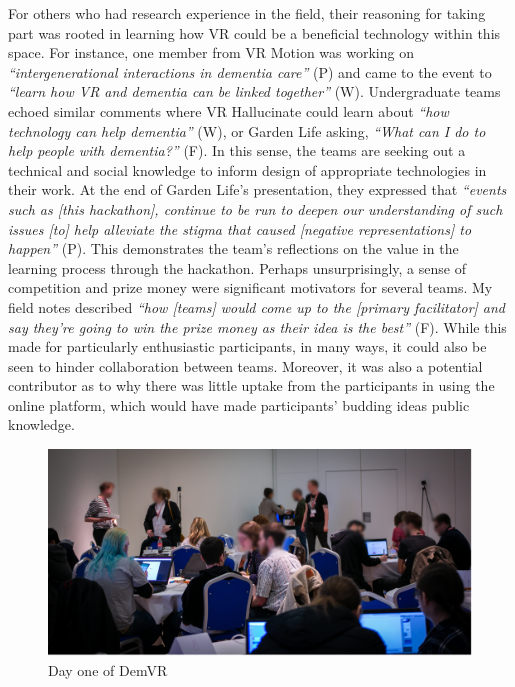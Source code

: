 For others who had research experience in the field, their reasoning for taking part was rooted in learning how VR could be a beneficial technology within this space. For instance, one member from VR Motion was working on \textit{``intergenerational interactions in dementia care''} (P) and came to the event to \textit{``learn how VR and dementia can be linked together''} (W). Undergraduate teams echoed similar comments where VR Hallucinate could learn about \textit{``how technology can help dementia''} (W), or Garden Life asking, \textit{``What can I do to help people with dementia?''} (F). In this sense, the teams are seeking out a technical and social knowledge to inform design of appropriate technologies in their work. At the end of Garden Life’s presentation, they expressed that \textit{``events such as [this hackathon], continue to be run to deepen our understanding of such issues [to] help alleviate the stigma that caused [negative representations] to happen''} (P). This demonstrates the team’s reflections on the value in the learning process through the hackathon. Perhaps unsurprisingly, a sense of competition and prize money were significant motivators for several teams. My field notes described \textit{``how [teams] would come up to the [primary facilitator] and say they’re going to win the prize money as their idea is the best''} (F). While this made for particularly enthusiastic participants, in many ways, it could also be seen to hinder collaboration between teams. Moreover, it was also a potential contributor as to why there was little uptake from the participants in using the online platform, which would have made participants’ budding ideas public knowledge.

\begin{figure}[htp]
\centering
\includegraphics[width=.8\linewidth]{Images/DemVR/Findings/DayOneDemVR.png}
\caption{Day one of DemVR}
\label{fig:DayOne}
\end{figure}

